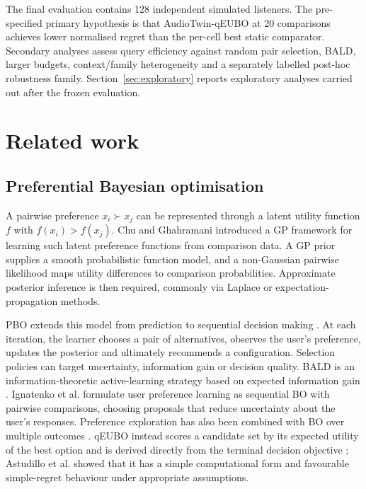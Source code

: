 \documentclass[preprint,12pt]{elsarticle}
\begin{document}
The final evaluation contains 128 independent simulated listeners. The pre-specified primary hypothesis is that AudioTwin-qEUBO at 20 comparisons achieves lower normalised regret than the per-cell best static comparator. Secondary analyses assess query efficiency against random pair selection, BALD, larger budgets, context/family heterogeneity and a separately labelled post-hoc robustness family. Section~\ref{sec:exploratory} reports exploratory analyses carried out after the frozen evaluation.

\section{Related work}
\label{sec:related}

\subsection{Preferential Bayesian optimisation}

A pairwise preference $x_i \succ x_j$ can be represented through a latent utility function $f$ with $f(x_i)>f(x_j)$. Chu and Ghahramani \cite{chu2005} introduced a GP framework for learning such latent preference functions from comparison data. A GP prior supplies a smooth probabilistic function model, and a non-Gaussian pairwise likelihood maps utility differences to comparison probabilities. Approximate posterior inference is then required, commonly via Laplace or expectation-propagation methods.

PBO extends this model from prediction to sequential decision making \cite{gonzalez2017}. At each iteration, the learner chooses a pair of alternatives, observes the user's preference, updates the posterior and ultimately recommends a configuration. Selection policies can target uncertainty, information gain or decision quality. BALD is an information-theoretic active-learning strategy based on expected information gain \cite{houlsby2011}. Ignatenko et al. \cite{ignatenko2025} formulate user preference learning as sequential BO with pairwise comparisons, choosing proposals that reduce uncertainty about the user's responses. Preference exploration has also been combined with BO over multiple outcomes \cite{lin2022}. qEUBO instead scores a candidate set by its expected utility of the best option and is derived directly from the terminal decision objective \cite{astudillo2023}; Astudillo et al. showed that it has a simple computational form and favourable simple-regret behaviour under appropriate assumptions.
\end{document}
